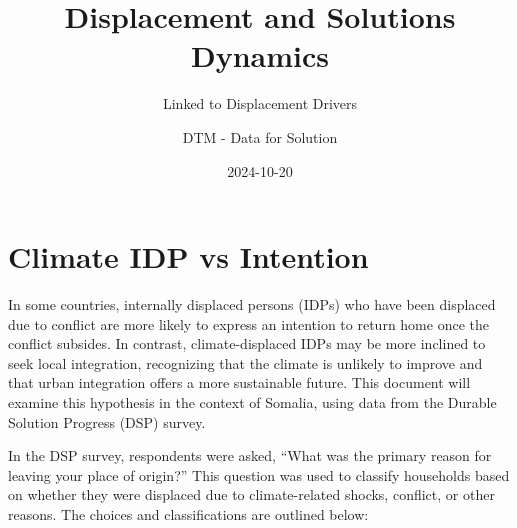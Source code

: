 \documentclass[
]{article}
\title{Displacement and Solutions Dynamics}
\subtitle{Linked to Displacement Drivers}
\author{DTM - Data for Solution}
\date{2024-10-20}
\begin{document}
\maketitle


\section{Climate IDP vs Intention}\label{climate-idp-vs-intention}

In some countries, internally displaced persons (IDPs) who have been
displaced due to conflict are more likely to express an intention to
return home once the conflict subsides. In contrast, climate-displaced
IDPs may be more inclined to seek local integration, recognizing that
the climate is unlikely to improve and that urban integration offers a
more sustainable future. This document will examine this hypothesis in
the context of Somalia, using data from the Durable Solution Progress
(DSP) survey.

In the DSP survey, respondents were asked, ``What was the primary reason
for leaving your place of origin?'' This question was used to classify
households based on whether they were displaced due to climate-related
shocks, conflict, or other reasons. The choices and classifications are
outlined below:
\end{document}
